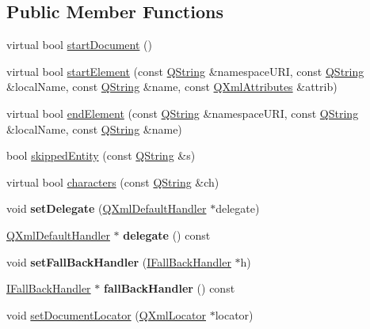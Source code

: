 \subsection*{Public Member Functions}
\begin{DoxyCompactItemize}
\item 
virtual bool \mbox{\hyperlink{class_base_handler_ad982903d941c15f7a89ff7a269a391df}{start\+Document}} ()
\item 
virtual bool \mbox{\hyperlink{class_base_handler_a15c20baf7065b3eb92ae7a336ccdf20b}{start\+Element}} (const \mbox{\hyperlink{class_q_string}{Q\+String}} \&namespace\+U\+RI, const \mbox{\hyperlink{class_q_string}{Q\+String}} \&local\+Name, const \mbox{\hyperlink{class_q_string}{Q\+String}} \&name, const \mbox{\hyperlink{class_q_xml_attributes}{Q\+Xml\+Attributes}} \&attrib)
\item 
virtual bool \mbox{\hyperlink{class_base_handler_aa1b987506d2f962ba478b8bab388bff9}{end\+Element}} (const \mbox{\hyperlink{class_q_string}{Q\+String}} \&namespace\+U\+RI, const \mbox{\hyperlink{class_q_string}{Q\+String}} \&local\+Name, const \mbox{\hyperlink{class_q_string}{Q\+String}} \&name)
\item 
bool \mbox{\hyperlink{class_base_handler_a2191a9b5ac9ebddc8c91dd56fff8e684}{skipped\+Entity}} (const \mbox{\hyperlink{class_q_string}{Q\+String}} \&s)
\item 
virtual bool \mbox{\hyperlink{class_base_handler_a9b7b29fcc7a0976d8e3be6f8ca1e67fd}{characters}} (const \mbox{\hyperlink{class_q_string}{Q\+String}} \&ch)
\item 
\mbox{\label{class_base_handler_ac94e086080a08af141e1db699fd45c12}} 
void {\bfseries set\+Delegate} (\mbox{\hyperlink{class_q_xml_default_handler}{Q\+Xml\+Default\+Handler}} $\ast$delegate)
\item 
\mbox{\label{class_base_handler_a9071c0c3d58da3fa786ba15a847f4d0c}} 
\mbox{\hyperlink{class_q_xml_default_handler}{Q\+Xml\+Default\+Handler}} $\ast$ {\bfseries delegate} () const
\item 
\mbox{\label{class_base_handler_a2bfce6fd9fd72a5d6ea20c90f8570e9c}} 
void {\bfseries set\+Fall\+Back\+Handler} (\mbox{\hyperlink{class_i_fall_back_handler}{I\+Fall\+Back\+Handler}} $\ast$h)
\item 
\mbox{\label{class_base_handler_a903d141d2d87ec7cb046c1dd9773c77a}} 
\mbox{\hyperlink{class_i_fall_back_handler}{I\+Fall\+Back\+Handler}} $\ast$ {\bfseries fall\+Back\+Handler} () const
\item 
void \mbox{\hyperlink{class_base_handler_abedc453093f90a5436a0bcb0c78b4aca}{set\+Document\+Locator}} (\mbox{\hyperlink{class_q_xml_locator}{Q\+Xml\+Locator}} $\ast$locator)
\end{DoxyCompactItemize}
